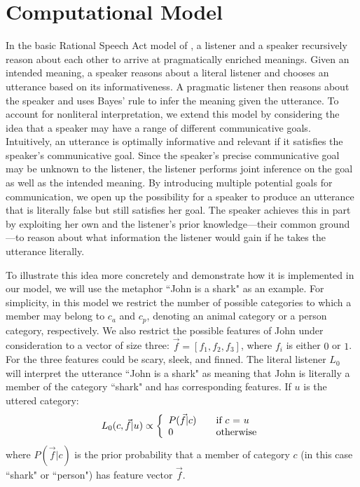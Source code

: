 \documentclass[10pt,letterpaper]{article}
\begin{document}
\section{Computational Model}
In the basic Rational Speech Act model of \cite{frank2012predicting, goodman2013knowledge}, a listener and a speaker recursively reason about each other to arrive at pragmatically enriched meanings. Given an intended meaning, a speaker reasons about a literal listener and chooses an utterance based on its informativeness. A pragmatic listener then reasons about the speaker and uses Bayes' rule to infer the meaning given the utterance. To account for nonliteral interpretation, we extend this model by considering the idea that a speaker may have a range of different communicative goals. Intuitively, an utterance is optimally informative and relevant if it satisfies the speaker's communicative goal. Since the speaker's precise communicative goal may be unknown to the listener, the listener performs joint inference on the goal as well as the intended meaning. By introducing multiple potential goals for communication, we open up the possibility for a speaker to produce an utterance that is literally false but still satisfies her goal. The speaker achieves this in part by exploiting her own and the listener's prior knowledge---their common ground \cite{clark1996using}---to reason about what information the listener would gain if he takes the utterance literally. 

To illustrate this idea more concretely and demonstrate how it is implemented in our model, we will use the metaphor ``John is a shark" as an example. For simplicity, in this model we restrict the number of possible categories to which a member may belong to $c_a$ and $c_p$, denoting an animal category or a person category, respectively. We also restrict the possible features of John under consideration to a vector of size three: $\vec f = [f_1, f_2, f_3]$, where $f_i$ is either $0$ or $1$. For the three features could be scary, sleek, and finned.
The literal listener $L_0$ will interpret the utterance ``John is a shark" as meaning that John is literally a member of the category ``shark" and has corresponding features. If $u$ is the uttered category:
\[ L_0(c, \vec f |u) \propto \left\{ 
  \begin{array}{l l}
    P(\vec f | c) & \quad \text{if $c$ = $u$}\\
    0 & \quad \text{otherwise}
  \end{array} \right.\]
where $P(\vec f | c)$ is the prior probability that a member of category $c$ (in this case ``shark" or ``person") has feature vector $\vec f$.
\end{document}

